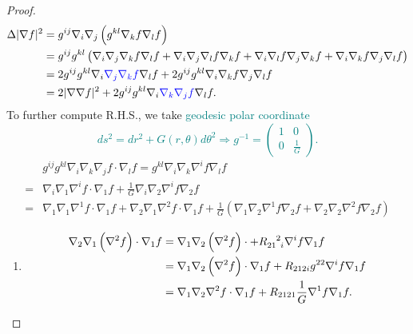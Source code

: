 \begin{proof}
    \begin{align*}
        \Delta |\nabla f|^2
        &=g^{ij}\nabla_i\nabla_j \left(g^{kl}\nabla_k f\nabla_l f\right)\\
        &=g^{ij}g^{kl}\left(
            \nabla_i\nabla_j\nabla_k f\nabla_l f+ \nabla_i\nabla_j\nabla_l f
            \nabla_k f+\nabla_i\nabla_l f\nabla_j \nabla_k f
            +\nabla_i\nabla_k f\nabla_j\nabla_l f \right)\\
        &=2 g^{ij}g^{kl}\nabla_i\textcolor{blue}{\nabla_j\nabla_k f}
            \nabla_l f+ 2 g^{ij}g^{kl}\nabla_i\nabla_k f\nabla_j\nabla_l f\\
        &=2|\nabla\nabla f|^2 + 2 g^{ij}g^{kl}\nabla_i 
        \textcolor{blue}{\nabla_k\nabla_j f}\nabla_l f.
    \end{align*}
    To further compute R.H.S., we take
    \textcolor{teal}{geodesic polar coordinate
    \[
        ds^2=dr^2+G(r,\theta)d\theta^2\Rightarrow g^{-1}=\begin{pmatrix}
            1&0\\
            0& \frac{1}{G}
        \end{pmatrix}.    
    \]
    }
    \begin{align*}
        &g^{ij}g^{kl}\nabla_i\nabla_k\nabla_j f\cdot \nabla_l f
        =g^{kl}\nabla_i\nabla_k\nabla^i f\nabla_l f\\
        =&\nabla_i\nabla_1\nabla^i f\cdot \nabla_1 f
        +\frac{1}{G}\nabla_i\nabla_2\nabla^i f\nabla_2 f\\
        =&\nabla_1\nabla_1\nabla^1 f \cdot \nabla_1 f+\nabla_2 \nabla_1
        \nabla^2 f\cdot \nabla_1 f+\frac{1}{G}\left(
            \nabla_1\nabla_2\nabla^1 f\nabla_2 f+\nabla_2\nabla_2\nabla^2 f
            \nabla_2 f
        \right)
    \end{align*}
    \begin{enumerate}[(1)]
        \item \begin{align*}
            \nabla_2\nabla_1\left(\nabla^2 f\right)\cdot \nabla_1 f
            &=\nabla_1 \nabla_2 \left(\nabla^2 f\right)\cdot + 
            \tensor{R}{_{21}^2_i}\nabla^i f\nabla_1 f
            \\
            &=\nabla_1 \nabla_2 \left(\nabla^2 f\right)\cdot \nabla_1 f
            + R_{212i}g^{22}\nabla^i f\nabla_1 f \\
            &=\nabla_1 \nabla_2 \nabla^2 f\cdot \nabla_1 f
            +R_{2121}\frac{1}{G}\nabla^1 f\nabla_1 f.

\end{align*}
\end{enumerate}
\end{proof}
